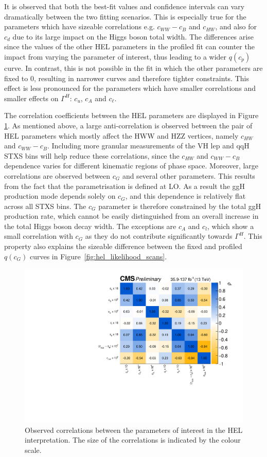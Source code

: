 It is observed that both the best-fit values and confidence intervals can vary dramatically between the two fitting scenarios. This is especially true for the parameters which have sizeable correlations e.g. $c_{WW}-c_B$ and $c_{HW}$, and also for $c_d$ due to its large impact on the Higgs boson total width. The differences arise since the values of the other HEL parameters in the profiled fit can counter the impact from varying the parameter of interest, thus leading to a wider $q(c_p)$ curve. In contrast, this is not possible in the fit in which the other parameters are fixed to 0, resulting in narrower curves and therefore tighter constraints. This effect is less pronounced for the parameters which have smaller correlations and smaller effects on $\Gamma^H$: $c_u$, $c_A$ and $c_\ell$. 

The correlation coefficients between the HEL parameters are displayed in Figure \ref{fig:hel_correlations}. As mentioned above, a large anti-correlation is observed between the pair of HEL parameters which mostly affect the HWW and HZZ vertices, namely $c_{HW}$ and $c_{WW}-c_B$. Including more granular measurements of the VH lep and qqH STXS bins will help reduce these correlations, since the $c_{HW}$ and $c_{WW}-c_B$ dependence varies for different kinematic regions of phase space. Moreover, large correlations are observed between $c_G$ and several other parameters. This results from the fact that the parametrisation is defined at LO. As a result the ggH production mode depends solely on $c_G$, and this dependence is relatively flat across all STXS bins. The $c_G$ parameter is therefore constrained by the total ggH production rate, which cannot be easily distinguished from an overall increase in the total Higgs boson decay width. The exceptions are $c_A$ and $c_l$, which show a small correlation with $c_G$ as they do not contribute significantly towards $\Gamma^H$. This property also explains the sizeable difference between the fixed and profiled $q(c_G)$ curves in Figure~\ref{fig:hel_likelihood_scans}.

\begin{figure}[htbp]
  \centering
  \includegraphics[width=.8\textwidth]{Figures/eft/hel_correlations.pdf}
  \caption[Correlations in HEL parameters]
  {
    Observed correlations between the parameters of interest in the HEL interpretation. The size of the correlations is indicated by the colour scale.
  }
  \label{fig:hel_correlations}
\end{figure}

